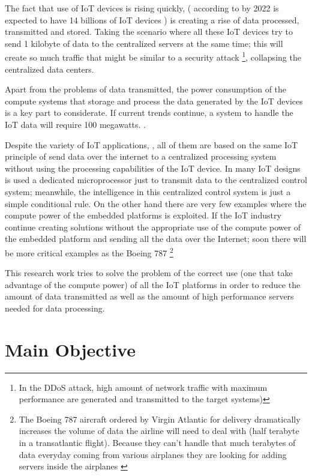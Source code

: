 The fact that use of IoT devices is rising quickly, ( according to
\cite{Benkhelifa} by 2022 is expected to have 14 billions of IoT devices ) is
creating a rise of data processed, transmitted and stored. Taking the scenario
where all these IoT devices try to send 1 kilobyte of data to the centralized
servers at the same time; this will create so much traffic that might be
similar to a security attack \footnote{ In the DDoS attack, high amount of
network traffic with maximum performance are generated and transmitted  to the
target systems\cite{Yang})}, collapsing the centralized data centers.

Apart from the problems of data transmitted, the power consumption of the
compute systems that storage and process the data generated by the IoT devices
is a key part to considerate. If current trends continue, a system to handle
the IoT data will require 100 megawatts. \cite{Xizhou}. 

Despite the variety of IoT applications, \cite{Liu-Dan} \cite{Du}, all of them
are based on the same IoT principle of send data over the internet to a
centralized processing system without using the processing capabilities of the
IoT device.  In many IoT designs \cite{Du} is used a dedicated microprocessor
just to transmit data to the centralized control system; meanwhile, the
intelligence in this centralized control system is just a simple conditional
rule. On the other hand there are very few examples \cite{Wun} where the
compute power of the embedded platforms is exploited. If the IoT industry
continue creating solutions without the appropriate use of the compute power of
the embedded platform and sending all the data over the Internet; soon there
will be more critical examples as the Boeing 787 \footnote{ The Boeing 787
aircraft ordered by Virgin Atlantic for delivery dramatically increases the
volume of data the airline will need to deal with (half terabyte in a
transatlantic flight). Because they can't handle that much terabytes of data
everyday coming from various airplanes they are looking for adding servers
inside the airplanes \cite{Virgin}}

This research work tries to solve the problem of the correct use (one that take
advantage of the compute power) of all the IoT platforms in order to reduce the
amount of data transmitted as well as the amount of high performance servers
needed for data processing. 


\section{Main Objective} \noindent

